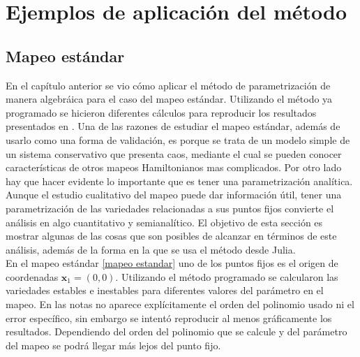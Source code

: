 
\chapter{Ejemplos de aplicación del método}
\label{SeccionEstandar}\section{Mapeo estándar}
En el capítulo anterior se vio cómo aplicar el método de parametrización de manera algebráica para el caso del mapeo estándar. Utilizando el método ya programado se hicieron diferentes cálculos para reproducir los resultados presentados en \citep{Mireles}. Una de las razones de estudiar el mapeo estándar, además de usarlo como una forma de validación, es porque se trata de un modelo simple de un sistema conservativo que presenta caos, mediante el cual se pueden conocer características de otros mapeos Hamiltonianos mas complicados. Por otro lado hay que hacer evidente lo importante que es tener una parametrización analítica. Aunque el estudio cualitativo del mapeo puede dar información útil, tener una parametrización de las variedades relacionadas a sus puntos fijos convierte el análisis en algo cuantitativo y semianalítico. El objetivo de esta sección es mostrar algunas de las cosas que son posibles de alcanzar en términos de este análisis, además de la forma en la que se usa el método desde Julia.\\

En el mapeo estándar \eqref{mapeo estandar} uno de los puntos fijos es el origen de coordenadas $\mathbf{x}_{1}=(0,0)$. Utilizando el método programado se calcularon las variedades estables e inestables para diferentes valores del parámetro en el mapeo. En las notas \citep{Mireles} no aparece explícitamente el orden del polinomio usado ni el error específico, sin embargo se intentó reproducir al menos gráficamente los resultados. Dependiendo del orden del polinomio que se calcule y del parámetro del mapeo se podrá llegar más lejos del punto fijo. \\


